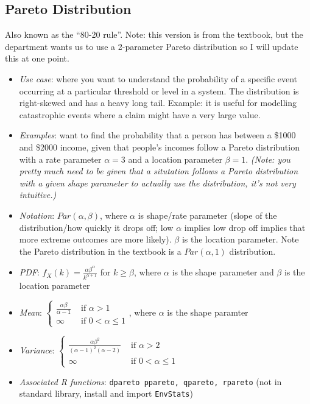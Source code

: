 \documentclass[12pt]{article}
\begin{document}
\subsection{Pareto Distribution}

Also known as the ``80-20 rule''. Note: this version is from the textbook,
but the department wants us to use a 2-parameter Pareto distribution so I
will update this at one point.

\begin{itemize}
	\item \textit{Use case}: where you want to understand the probability of a
	      specific event occurring at a particular threshold or level in a system. The
	      distribution is right-skewed and has a heavy long tail. Example: it is
	      useful for modelling catastrophic events where a claim might have a
	      very large value.
	\item \textit{Examples}: want to find the probability that a person has
	      between a \$1000 and \$2000 income, given that people's incomes follow
	      a Pareto distribution with a rate parameter $\alpha = 3$ and a location
	      parameter $\beta = 1$. \emph{(Note: you pretty much need to be given
		      that a situtation follows a Pareto distribution with a given shape
		      parameter to actually use the distribution, it's not very intuitive.)}
	\item \textit{Notation}: $Par(\alpha, \beta)$, where $\alpha$ is shape/rate
	      parameter (slope of the distribution/how quickly it drops off; low
	      $\alpha$ implies low drop off implies that more extreme outcomes are
	      more likely). $\beta$ is the location parameter. Note the Pareto distribution
	      in the textbook is a $Par(\alpha, 1)$ distribution.
	\item \textit{PDF}: $f_X(k) = \frac{\alpha \beta^{\alpha}}{k^{\alpha +
					      1}}$ for $k \geq \beta$, where $\alpha$ is the shape parameter and
	      $\beta$ is the location parameter
	\item \textit{Mean}: $\begin{cases}
			      \frac{\alpha\beta}{\alpha - 1} & \text{ if } \alpha > 1        \\
			      \infty                         & \text{ if } 0 < \alpha \leq 1
		      \end{cases}$, where $\alpha$ is the shape paramter
	\item \textit{Variance}: $\begin{cases}
			      \frac{\alpha \beta^2}{(\alpha-1)^2(\alpha-2)} & \text{ if } \alpha > 2        \\
			      \infty                                        & \text{ if } 0 < \alpha \leq 1
		      \end{cases}$
	\item \textit{Associated R functions}: \verb|dpareto ppareto, qpareto, rpareto| (not in standard library, install and import \verb|EnvStats|)
\end{itemize}
\end{document}
